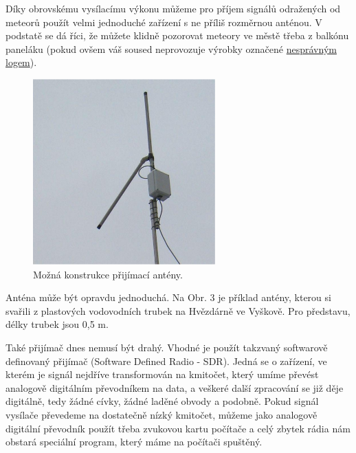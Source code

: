 \documentclass[10pt,a5paper,twoside]{book}
\begin{document}
Díky obrovskému vysílacímu výkonu můžeme pro příjem signálů odražených od meteorů použít velmi jednoduché zařízení s ne příliš rozměrnou anténou. V podstatě se dá říci, že můžete klidně pozorovat meteory ve městě třeba z balkónu paneláku (pokud ovšem váš soused neprovozuje výrobky označené \href{http://en.wikipedia.org/wiki/File:Comparison_of_two_used_CE_marks.svg}{nesprávným logem}).
\begin{figure}[htbp]
	\begin{center}
		\includegraphics[width=7cm]{graves/graves_soubory/image005.eps}
	  	\caption{Možná konstrukce přijímací antény.}
	  	\label{fig:}
	\end{center}
\end{figure}
Anténa může být opravdu jednoduchá. Na Obr. 3 je příklad antény, kterou si svařili z plastových vodovodních trubek na Hvězdárně ve Vyškově. Pro představu, délky trubek jsou 0,5 m.

Také přijímač dnes nemusí být drahý. Vhodné je použít takzvaný softwarově definovaný přijímač (Software Defined Radio - SDR). Jedná se o zařízení, ve kterém je signál nejdříve transformován na kmitočet, který umíme převést analogově digitálním převodníkem na data, a veškeré další zpracování se již děje digitálně, tedy žádné cívky, žádné laděné obvody a podobně. Pokud signál vysílače převedeme na dostatečně nízký kmitočet, můžeme jako analogově digitální převodník použít třeba zvukovou kartu počítače a celý zbytek rádia nám obstará speciální program, který máme na počítači spuštěný.
\end{document}
